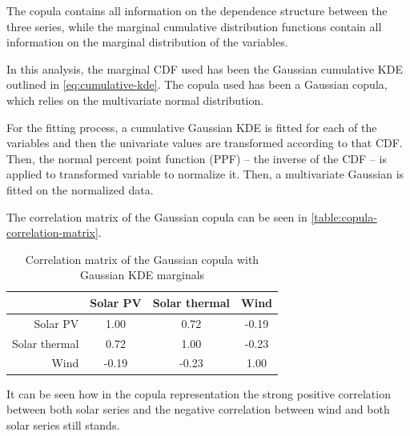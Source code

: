 The copula contains all information on the dependence structure between the three series, while the marginal cumulative distribution functions contain all information on the marginal distribution of the variables. 

In this analysis, the marginal CDF used has been the Gaussian cumulative KDE outlined in \eqref{eq:cumulative-kde}. The copula used has been a Gaussian copula, which relies on the multivariate normal distribution.

For the fitting process, a cumulative Gaussian KDE is fitted for each of the variables and then the univariate values are transformed according to that CDF. Then, the normal percent point function (PPF) -- the inverse of the CDF -- is applied to transformed variable to normalize it. Then, a multivariate Gaussian is fitted on the normalized data. 

The correlation matrix of the Gaussian copula can be seen in \autoref{table:copula-correlation-matrix}.

\begin{table}[ht]
    \centering
    \begin{tabular}{r|ccc}
        & Solar PV & Solar thermal & Wind \\
        \midrule
        Solar PV & 1.00 & 0.72 & -0.19 \\
        Solar thermal & 0.72 & 1.00 & -0.23 \\
        Wind & -0.19 & -0.23 & 1.00 \\
    \end{tabular}
    \caption{Correlation matrix of the Gaussian copula with Gaussian KDE marginals}
    \label{table:copula-correlation-matrix}
\end{table}

It can be seen how in the copula representation the strong positive correlation between both solar series and the negative correlation between wind and both solar series still stands. 

